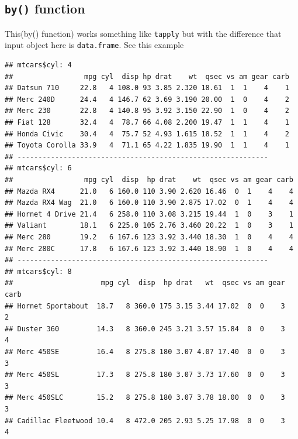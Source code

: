 \documentclass[
]{book}
\newenvironment{Shaded}{\begin{snugshade}}{\end{snugshade}}
\newcommand{\CommentTok}[1]{\textcolor[rgb]{0.56,0.35,0.01}{\textit{#1}}}
\newcommand{\FunctionTok}[1]{\textcolor[rgb]{0.13,0.29,0.53}{\textbf{#1}}}
\newcommand{\NormalTok}[1]{#1}
\newcommand{\SpecialCharTok}[1]{\textcolor[rgb]{0.81,0.36,0.00}{\textbf{#1}}}
\begin{document}
\hypertarget{by-function}{%
\subsection{\texorpdfstring{\texttt{by()} function}{by() function}}\label{by-function}}

This\index(by() function) works something like \texttt{tapply} but with the difference that input object here is \texttt{data.frame}. See this example

\begin{Shaded}
\end{Shaded}

\begin{verbatim}
## mtcars$cyl: 4
##                 mpg cyl  disp hp drat    wt  qsec vs am gear carb
## Datsun 710     22.8   4 108.0 93 3.85 2.320 18.61  1  1    4    1
## Merc 240D      24.4   4 146.7 62 3.69 3.190 20.00  1  0    4    2
## Merc 230       22.8   4 140.8 95 3.92 3.150 22.90  1  0    4    2
## Fiat 128       32.4   4  78.7 66 4.08 2.200 19.47  1  1    4    1
## Honda Civic    30.4   4  75.7 52 4.93 1.615 18.52  1  1    4    2
## Toyota Corolla 33.9   4  71.1 65 4.22 1.835 19.90  1  1    4    1
## ------------------------------------------------------------ 
## mtcars$cyl: 6
##                 mpg cyl  disp  hp drat    wt  qsec vs am gear carb
## Mazda RX4      21.0   6 160.0 110 3.90 2.620 16.46  0  1    4    4
## Mazda RX4 Wag  21.0   6 160.0 110 3.90 2.875 17.02  0  1    4    4
## Hornet 4 Drive 21.4   6 258.0 110 3.08 3.215 19.44  1  0    3    1
## Valiant        18.1   6 225.0 105 2.76 3.460 20.22  1  0    3    1
## Merc 280       19.2   6 167.6 123 3.92 3.440 18.30  1  0    4    4
## Merc 280C      17.8   6 167.6 123 3.92 3.440 18.90  1  0    4    4
## ------------------------------------------------------------ 
## mtcars$cyl: 8
##                     mpg cyl  disp  hp drat   wt  qsec vs am gear carb
## Hornet Sportabout  18.7   8 360.0 175 3.15 3.44 17.02  0  0    3    2
## Duster 360         14.3   8 360.0 245 3.21 3.57 15.84  0  0    3    4
## Merc 450SE         16.4   8 275.8 180 3.07 4.07 17.40  0  0    3    3
## Merc 450SL         17.3   8 275.8 180 3.07 3.73 17.60  0  0    3    3
## Merc 450SLC        15.2   8 275.8 180 3.07 3.78 18.00  0  0    3    3
## Cadillac Fleetwood 10.4   8 472.0 205 2.93 5.25 17.98  0  0    3    4
\end{verbatim}
\end{document}
